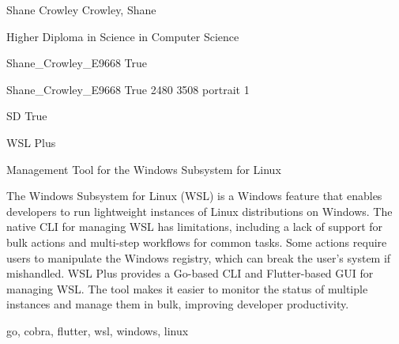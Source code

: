 \documentclass[twoside]{report}
\begin{document}
\begingroup{}\relax



\def\Key{Shane_Crowley_E9668}

{Shane Crowley}
{Crowley, Shane}

{Higher Diploma in Science in Computer Science}

{Shane_Crowley_E9668}
{True}

{Shane_Crowley_E9668}
{True}
{2480}
{3508}
{portrait}
{1}

{SD}
{True}

{WSL Plus}

{Management Tool for the Windows Subsystem for Linux}

{The Windows Subsystem for Linux (WSL) is a Windows feature that enables developers to run lightweight instances of Linux distributions on Windows. The native CLI for managing WSL has limitations, including a lack of support for bulk actions and multi-step workflows for common tasks. Some actions require users to manipulate the Windows registry, which can break the user's system if mishandled. WSL Plus provides a Go-based CLI and Flutter-based GUI for managing WSL. The tool makes it easier to monitor the status of multiple instances and manage them in bulk, improving developer productivity.}

{go, cobra, flutter, wsl, windows, linux}
\end{document}

